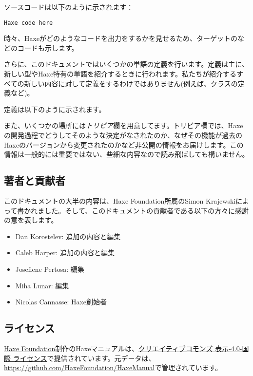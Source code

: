ソースコードは以下のように示されます：

\begin{lstlisting}
Haxe code here
\end{lstlisting}

時々、Haxeがどのようなコードを出力をするかを見せるため、ターゲットのなどのコードも示します。

さらに、このドキュメントではいくつかの単語の定義を行います。定義は主に、新しい型やHaxe特有の単語を紹介するときに行われます。私たちが紹介するすべての新しい内容に対して定義をするわけではありません(例えば、クラスの定義など)。

定義は以下のように示されます。


また、いくつかの場所には\emph{トリビア}欄を用意してます。トリビア欄では、Haxeの開発過程でどうしてそのような決定がなされたのか、なぜその機能が過去のHaxeのバージョンから変更されたのかなど非公開の情報をお届けします。この情報は一般的には重要ではない、些細な内容なので読み飛ばしても構いません。


\subsection{著者と貢献者}
\label{introduction-authors-and-contributions}

このドキュメントの大半の内容は、Haxe Foundation所属のSimon Krajewskiによって書かれました。そして、このドキュメントの貢献者である以下の方々に感謝の意を表します。

\begin{itemize}
	\item Dan Korostelev: 追加の内容と編集
	\item Caleb Harper: 追加の内容と編集
	\item Josefiene Pertosa: 編集
	\item Miha Lunar: 編集
	\item Nicolas Cannasse: Haxe創始者
\end{itemize}

\subsection{ライセンス}
\label{introduction-license}

\href{http://haxe.org/foundation}{Haxe Foundation}制作のHaxeマニュアルは、\href{http://creativecommons.org/licenses/by/4.0/}{クリエイティブコモンズ 表示-4.0-国際 ライセンス}で提供されています。元データは、\href{https://github.com/HaxeFoundation/HaxeManual}{https://github.com/HaxeFoundation/HaxeManual}で管理されています。

